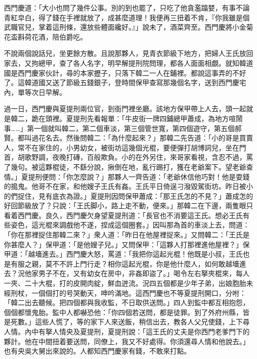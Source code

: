 西門慶道：「大小也問了幾件公事。別的到也罷了，只吃了他貪濫蹹婪，有事不論青紅皁白，得了錢在手裡就放了，{}成甚麼道理！我便再三扭着不肯，『你我雖是個武職官兒，掌着這刑條，還放些體面纔好。』」說未了，酒菜齊至。西門慶將小金菊花盃斟荷花酒，陪伯爵吃。

不說兩個說話兒，坐更餘方散。且說那夥人，見青衣節級下地方，把婦人王氏放回家去，又拘總甲，查了各人名字，明早解提刑院問理，都各人面面相覷。{}就知韓道國是西門慶家伙計，尋的本家攊子，只落下韓二一人在鋪裡。都說這事弄的不好了。這韓道國又送了節級五錢銀子，登時間保甲查寫那幾個名字，送到西門慶宅內，單等次日早解。

過一日，西門慶與夏提刑兩位官，到衙門裡坐廳。該地方保甲帶上人去，頭一起就是韓二，跪在頭裡。夏提刑先看報單：「牛皮街一牌四鋪總甲蕭成，為地方喧鬧事……」第一個就叫韓二，第二個車淡，第三個管世寬，第四個遊守，第五個郝賢。都叫過花名去。然後問韓二：「為什麼起來？」那韓二先告道：「小的哥是買賣人，常不在家住的，小男幼女，被街坊這幾個光棍，要便彈打胡博詞兒，坐在門首，胡歌野調，夜晚打磚，百般欺負。小的在外另住，來哥家看視，含忍不過，罵了幾句。被這夥棍徒，不繇分說，揪倒在地，亂行踢打，獲在老爺案下。望老爺查情。」夏提刑便問：「你怎麼說？」那夥人一齊告道：「老爺休信他巧對！他是耍錢的搗鬼。他哥不在家，和他嫂子王氏有姦。王氏平日倚逞刁潑毀駕街坊。昨日被小的們捉住，見有底衣為證。」夏提刑因問保甲蕭成：「那王氏怎的不見？」蕭成怎的好回節級放了？只說：「王氏脚小，路上走不動，便來。」那韓二在下邊，兩隻眼只看着西門慶。良久，西門慶欠身望夏提刑道：「長官也不消要這王氏。想必王氏有些姿色，這光棍來調戲他不遂，捏成這個圈套。」{}因叫那為首的車淡上去，問道：「你在那裡捉住那韓二來？」衆人道：「昨日在他屋裡捉來。」又問韓二：「王氏是你甚麼人？」保甲道：「是他嫂子兒。」又問保甲：「這夥人打那裡進他屋裡？」保甲道：「越墻進去。」西門慶大怒，罵道：「我把你這起光棍！他既是小叔，王氏也是有服之親，莫不不許上門行走？相你這起光棍，你是他什麼人，如何敢越墻進去？況他家男子不在，又有幼女在房中，非姦即盜了。」{}喝令左右拏夾棍來，每人一夾、二十大棍，打的皮開肉綻，鮮血迸流。況四五個都是少年子弟，出娘胞胎未經刑杖，一個個打的号哭動天，呻吟滿地。這西門慶也不等夏提刑開口，分咐：「韓二出去聽候。把四個都與我收監，不日取供送問。」四人到監中都互相抱怨，個個都懷鬼胎。監中人都嚇恐他：「你四個若送問，都是徒罪。到了外府州縣，皆是死數。」這些人慌了，等的家下人來送飯，稍信出去，教各人父兄使錢，上下尋人情。內中有拏人情央及夏提刑，夏提刑說：「這王氏的丈夫是你西門老爹門下的夥計。他在中間扭着要送問，同僚上，我又不好處得。你須還尋人情和他說去。」也有央吳大舅出來說的。人都知西門慶家有錢，不敢來打點。

